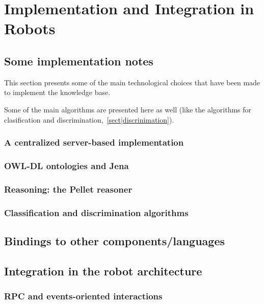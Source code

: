 \chapter{Implementation and Integration in Robots}
\label{chapter|implementation_integration}

\section{Some implementation notes}

This section presents some of the main technological choices that have
been made to implement the knowledge base.

Some of the main algorithms are presented here as well (like the algorithms for clasification and discrimination,~\ref{sect|discrinimation}).

\subsection{A centralized server-based implementation}
\label{sect|oro-serverbased}


\subsection{OWL-DL ontologies and Jena}
\label{sect|jena}

\subsection{Reasoning: the Pellet reasoner}
\label{sect|pellet}

\subsection{Classification and discrimination algorithms}
\label{sect|discrimination}

\section{Bindings to other components/languages}
\label{sect|interfacing}

\section{Integration in the robot architecture}

\subsection{RPC and events-oriented interactions}

